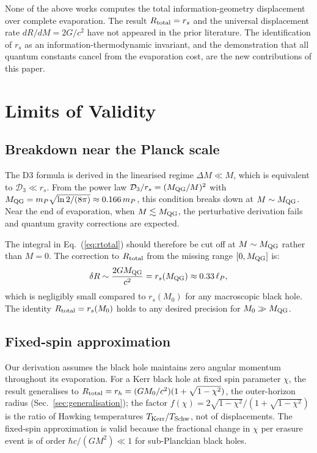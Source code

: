 \documentclass[aps,prd,twocolumn,showpacs,preprintnumbers,amsmath,amssymb,longbibliography]{revtex4-2}
\begin{document}
None of the above works computes the total information-geometry displacement over 
complete evaporation. The result $R_{\rm total} = r_s$ and the universal displacement 
rate $dR/dM = 2G/c^2$ have not appeared in the prior literature. The identification 
of $r_s$ as an information-thermodynamic invariant, and the demonstration that all 
quantum constants cancel from the evaporation cost, are the new contributions of 
this paper.

\section{Limits of Validity}
\label{sec:limits}

\subsection{Breakdown near the Planck scale}

The D3 formula is derived in the linearised regime $\Delta M \ll M$, which is 
equivalent to $\mathcal{D}_3 \ll r_s$. From the power law $\mathcal{D}_3/r_s = (M_{\rm QG}/M)^2$ 
with $M_{\rm QG} = m_P \sqrt{\ln 2/(8\pi)} \approx 0.166\, m_P$, 
this condition breaks down at $M \sim M_{\rm QG}$. Near the end of evaporation, 
when $M \lesssim M_{\rm QG}$, the perturbative derivation fails and quantum gravity 
corrections are expected.

The integral in Eq.~(\ref{eq:rtotal}) should therefore be cut off at $M \sim M_{\rm QG}$ 
rather than $M = 0$. The correction to $R_{\rm total}$ from the missing range 
$[0, M_{\rm QG}]$ is:
\begin{equation}
\delta R \sim \frac{2G M_{\rm QG}}{c^2} = r_s(M_{\rm QG}) \approx 0.33\, \ell_P,
\end{equation}
which is negligibly small compared to $r_s(M_0)$ for any macroscopic black hole. 
The identity $R_{\rm total} = r_s(M_0)$ holds to any desired precision for 
$M_0 \gg M_{\rm QG}$.

\subsection{Fixed-spin approximation}

Our derivation assumes the black hole maintains zero angular momentum throughout 
its evaporation. For a Kerr black hole at fixed spin parameter $\chi$, the result 
generalises to $R_{\rm total} = r_h = (GM_0/c^2)(1+\sqrt{1-\chi^2})$, the outer-horizon 
radius (Sec.~\ref{sec:generalisation}); the factor $f(\chi) = 2\sqrt{1-\chi^2}/(1+\sqrt{1-\chi^2})$ is the ratio of Hawking temperatures $T_{\rm Kerr}/T_{\rm Schw}$, not of displacements. 
The fixed-spin approximation is valid because the fractional change in $\chi$ per 
erasure event is of order $\hbar c/(GM^2) \ll 1$ for sub-Planckian black holes.
\end{document}

